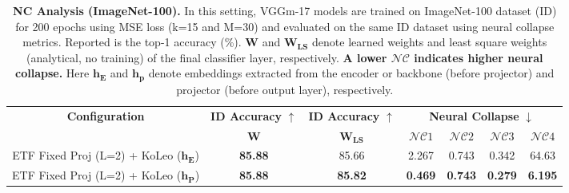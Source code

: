 \begin{table*}[t]
\centering
  \caption{\textbf{NC Analysis (ImageNet-100).} In this setting, VGGm-17 models are trained on ImageNet-100 dataset (ID) for 200 epochs using MSE loss (k=15 and M=30) and evaluated on the same ID dataset using neural collapse metrics. Reported is the top-1 accuracy (\%). $\mathbf{W}$ and $\mathbf{W_{LS}}$ denote learned weights and least square weights (analytical, no training) of the final classifier layer, respectively. \textbf{A lower $\mathcal{NC}$ indicates higher neural collapse.} Here $\mathbf{h_E}$ and $\mathbf{h_p}$ denote embeddings extracted from the encoder or backbone (before projector) and projector (before output layer), respectively.}
  \label{tab:nc_results_100c}
  \centering
     \begin{tabular}{ccc|cccc}
     \hline %
     \multicolumn{1}{c}{\textbf{Configuration}} &
     \multicolumn{1}{c}{\textbf{ID Accuracy} $\uparrow$} &
     \multicolumn{1}{c|}{\textbf{ID Accuracy} $\uparrow$} &
     \multicolumn{4}{c}{\textbf{Neural Collapse} $\downarrow$} \\
    & $\mathbf{W}$ & $\mathbf{W_{LS}}$ & $\mathcal{NC}1$ &  $\mathcal{NC}2$ &  $\mathcal{NC}3$ &  $\mathcal{NC}4$ \\
    \hline \hline
    ETF Fixed Proj (L=2) + KoLeo ($\mathbf{h_E}$) & \textbf{85.88} & 85.66 & 2.267 & 0.743 & 0.342 & 64.63 \\
    ETF Fixed Proj (L=2) + KoLeo ($\mathbf{h_P}$) & \textbf{85.88} & \textbf{85.82} & \textbf{0.469} & \textbf{0.743} & \textbf{0.279} & \textbf{6.195} \\
    \hline \hline
    \end{tabular} %
\end{table*}